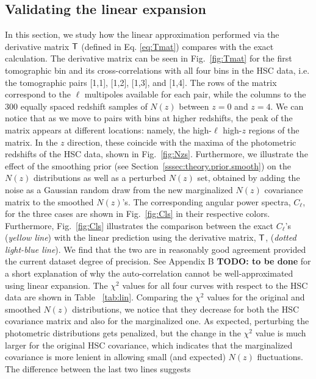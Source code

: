 \documentclass[a4paper,11pt]{article}
\newcommand{\todo}[1]{{\bf TODO: #1}}
\begin{document}
\subsection{Validating the linear expansion}\label{ssec:hsc.lin}
In this section, we study how the linear
approximation performed via the derivative 
matrix ${\sf T}$ (defined in Eq. \ref{eq:Tmat})
compares with the exact calculation. The
derivative matrix can be seen in Fig.~\ref{fig:Tmat}
for the first tomographic
bin and its cross-correlations with
all four bins in the HSC data, 
i.e. the tomographic pairs [1,1], [1,2],
[1,3], and [1,4]. The rows of the matrix correspond
to the $\ell$ multipoles available for each pair, 
while the columns to the 300 equally
spaced redshift samples of $N(z)$
between $z = 0$ and $z = 4$. We can notice that
as we move to pairs with bins at higher redshifts,
the peak of the matrix appears at different locations:
namely, the high-$\ell$ high-$z$ regions of the matrix.
In the $z$ direction, these coincide with the maxima
of the photometric redshifts of the HSC data, shown in
Fig.~\ref{fig:Nzs}. Furthermore, we illustrate the
effect of the smoothing prior (see 
Section~\ref{sssec:theory.prior.smooth})
on the $N(z)$ distributions as well as a perturbed $N(z)$
set, obtained by adding the noise as
a Gaussian random draw from the new marginalized $N(z)$ covariance matrix to the smoothed $N(z)$'s.
The corresponding angular power spectra, $C_\ell$,
for the three cases are shown in Fig.~\ref{fig:Cls}
in their respective colors. Furthermore, 
Fig.~\ref{fig:Cls} illustrates the comparison
between the exact $C_\ell$'s (\textit{yellow line}) with 
the linear prediction using the derivative matrix, ${\sf T}$,
(\textit{dotted light-blue line}). We find that the
two are in reasonably good agreement provided the current 
dataset degree of precision. See Appendix B \todo{to be done} 
for a short explanation of
why the auto-correlation cannot be well-approximated
using linear expansion. The $\chi^2$ values for all four
curves with respect to the HSC data are shown in Table~
\ref{tab:lin}. Comparing the $\chi^2$ 
values for the original and smoothed $N(z)$ distributions,
we notice that they decrease for both the
HSC covariance matrix and also for the marginalized one.
As expected, perturbing the photometric distributions
gets penalized, but the change in the $\chi^2$ value
is much larger for the original HSC covariance, which
indicates that the marginalized covariance is more lenient in
allowing small (and expected) $N(z)$ fluctuations.
The difference between the last two lines suggests 
\end{document}
